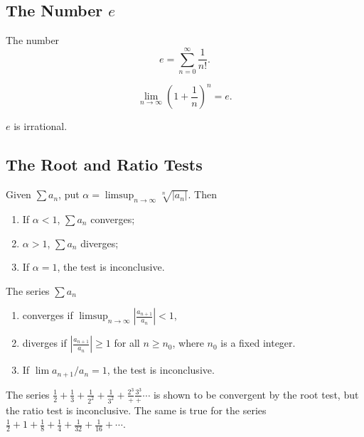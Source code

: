 \documentclass{article}
\begin{document}
\subsection{The Number $e$}
\begin{definition}
    The number\[e=\sum_{n=0}^{\infty}\frac{1}{n!}.\]
\end{definition}
\begin{theorem}
    \[\lim_{n\rightarrow\infty}\left(1+\frac{1}{n}\right)^{n}=e.\]
\end{theorem}
\begin{theorem}
    $e$ is irrational. 
\end{theorem}

\subsection{The Root and Ratio Tests}
\begin{theorem}
    Given $\sum a_{n}$, put $\alpha=\limsup_{n\rightarrow\infty}\sqrt[n]{|a_{n}|}.$ Then 
    \begin{enumerate}
        \item If $\alpha<1$, $\sum a_{n}$ converges;
        \item $\alpha>1$, $\sum a_{n}$ diverges;
        \item If $\alpha=1$, the test is inconclusive.
    \end{enumerate}
\end{theorem}
\begin{theorem}
    The series $\sum a_{n}$
    \begin{enumerate}
        \item converges if $\limsup_{n\rightarrow\infty}\left|\frac{a_{n+1}}{a_{n}}\right|<1$,
    \item diverges if $\left|\frac{a_{n+1}}{a_{n}}\right|\geq 1$ for all $n\geq n_{0}$, where $n_{0}$ is a fixed integer.
        \item If $\lim a_{n+1}/a_{n}=1$, the test is inconclusive.
    \end{enumerate}
\end{theorem}
\begin{example}
    \listhack 
    \ii The series $\frac{1}{2}+\frac{1}{3}+\frac{1}{2^{2}}+\frac{1}{3^{2}}+\frac{2^{3}}+\frac{3^{3}}+\dotsi$ is shown to be convergent by the root test, but the ratio test is inconclusive.
    \ii The same is true for the series $\frac{1}{2}+1+\frac{1}{8}+\frac{1}{4}+\frac{1}{32}+\frac{1}{16}+\dotsi$.
\end{example}
\end{document}
